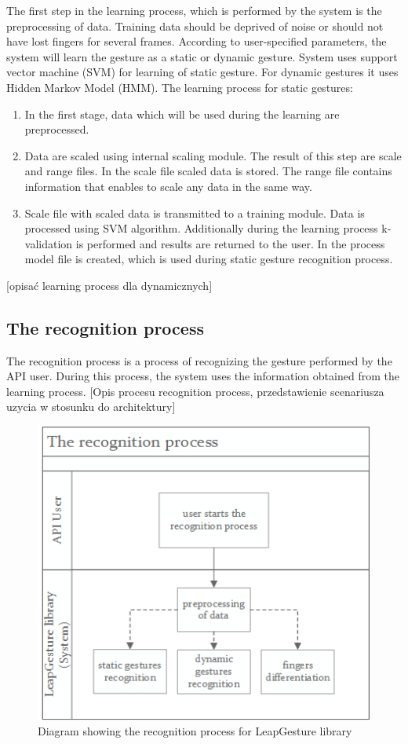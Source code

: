 The first step in the learning process, which is performed by the system is the preprocessing of data. Training data should be deprived of noise or should not have lost fingers for several frames. According to user-specified parameters, the system will learn the gesture as a static or dynamic gesture.
System uses support vector machine (SVM) for learning of static gesture. For dynamic gestures it uses Hidden Markov Model (HMM). 
The learning process for static gestures:
\begin{enumerate}
\item In the first stage, data which will be used during the learning are preprocessed.
\item Data are scaled using internal scaling module. The result of this step are scale and range files. In the scale file scaled data is stored. The range file contains information that enables to scale any data in the same way.
\item Scale file with scaled data is transmitted to a training module. Data is processed using SVM algorithm. Additionally during the learning process k-validation is performed and results are returned to the user. In the process model file is created, which is used during static gesture recognition process.
\end{enumerate}
{\color{red}[opisać learning process dla dynamicznych]}


\subsection{The recognition process}
The recognition process is a process of recognizing the gesture performed by the API user. During this process, the system uses the information obtained from the learning process. {\color{red}[Opis procesu recognition process, przedstawienie scenariusza uzycia w stosunku do architektury]}

\begin{figure}[htb]
\centering
 \includegraphics[width=0.6\columnwidth]{figures/recognitionProcess.png}
 \caption{Diagram showing the recognition process for LeapGesture library}
 \label{recognitionprocess}
\end{figure}

